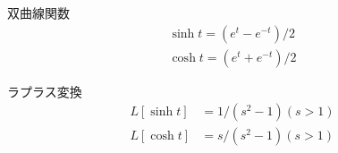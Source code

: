 \begin{frame}{双曲線関数}
  \begin{align*}
    \sinh t = (e^t - e^{-t}) / 2 \\
    \cosh t = (e^t + e^{-t}) / 2
  \end{align*}
  \begin{block}{ラプラス変換}
  \begin{align*}
    L[\sinh t] &= 1/(s^{2}-1)  (s > 1) \\
    L[\cosh t] &= s/(s^{2}-1)  (s > 1)
  \end{align*}
  \end{block}
\end{frame}

